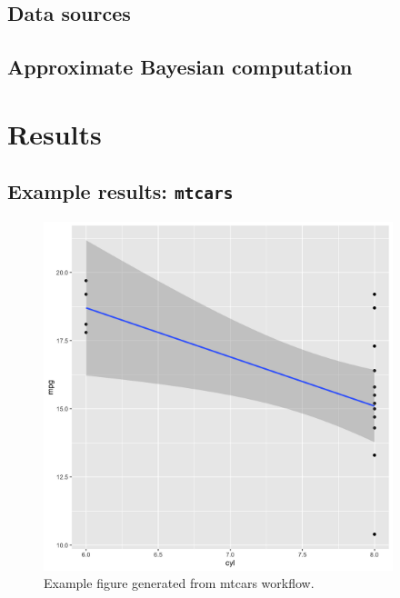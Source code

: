 \documentclass[12pt]{article}
\begin{document}



\subsection{Data sources}
\subsection{Approximate Bayesian computation}

\section{Results}
\subsection{Example results: \texttt{mtcars}}
\begin{figure}[htbp]
    \centering
    \includegraphics[width=4in]{figures/mt_cars_summary.png}
    \caption{Example figure generated from mtcars workflow.}
    \label{fig:mtcars}
\end{figure}
\end{document}
